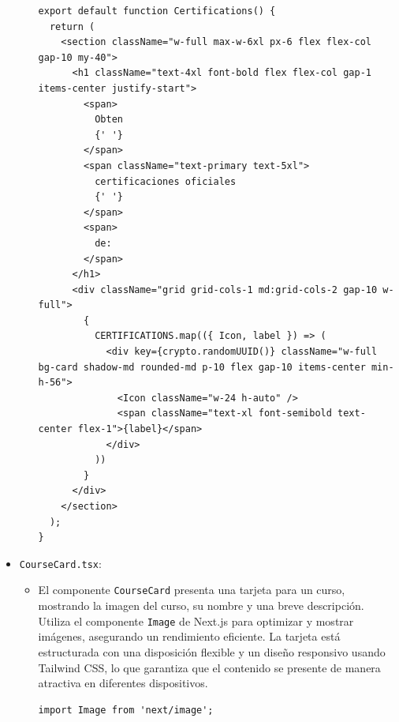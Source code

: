 \begin{itemize}
\begin{itemize}
\begin{verbatim}
export default function Certifications() {
  return (
    <section className="w-full max-w-6xl px-6 flex flex-col gap-10 my-40">
      <h1 className="text-4xl font-bold flex flex-col gap-1 items-center justify-start">
        <span>
          Obten
          {' '}
        </span>
        <span className="text-primary text-5xl">
          certificaciones oficiales
          {' '}
        </span>
        <span>
          de:
        </span>
      </h1>
      <div className="grid grid-cols-1 md:grid-cols-2 gap-10 w-full">
        {
          CERTIFICATIONS.map(({ Icon, label }) => (
            <div key={crypto.randomUUID()} className="w-full bg-card shadow-md rounded-md p-10 flex gap-10 items-center min-h-56">
              <Icon className="w-24 h-auto" />
              <span className="text-xl font-semibold text-center flex-1">{label}</span>
            </div>
          ))
        }
      </div>
    </section>
  );
}
    \end{verbatim}
  \end{itemize} 
  \item \texttt{CourseCard.tsx}:
  \begin{itemize}
    \item El componente \texttt{CourseCard} presenta una tarjeta para un curso, mostrando la imagen del curso, su nombre y una breve descripción. Utiliza el componente \texttt{Image} de Next.js para optimizar y mostrar imágenes, asegurando un rendimiento eficiente. La tarjeta está estructurada con una disposición flexible y un diseño responsivo usando Tailwind CSS, lo que garantiza que el contenido se presente de manera atractiva en diferentes dispositivos.
    \begin{verbatim}
import Image from 'next/image';


\end{verbatim}
\end{itemize}
\end{itemize}
